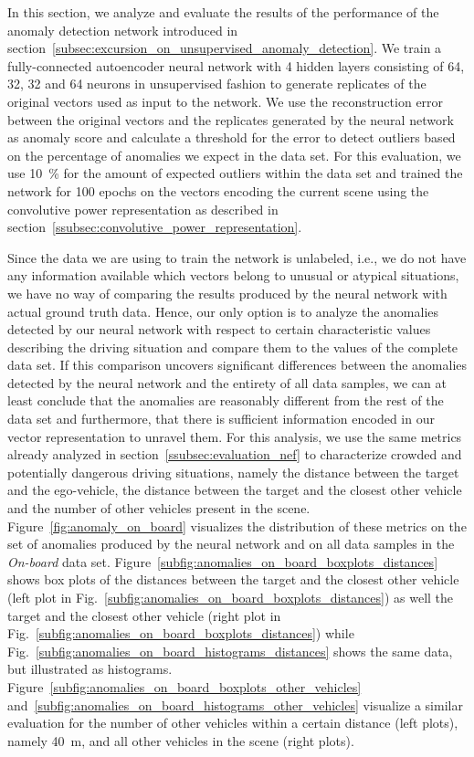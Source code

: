 In this section, we analyze and evaluate the results of the performance of the anomaly detection network introduced in section~\ref{subsec:excursion_on_unsupervised_anomaly_detection}.
We train a fully-connected autoencoder neural network with \num{4} hidden layers consisting of \num{64}, \num{32}, \num{32} and \num{64} neurons in unsupervised fashion to generate replicates of the original vectors used as input to the network.
We use the reconstruction error between the original vectors and the replicates generated by the neural network as anomaly score and calculate a threshold for the error to detect outliers based on the percentage of anomalies we expect in the data set.
For this evaluation, we use \SI{10}{\percent} for the amount of expected outliers within the data set and trained the network for \num{100} epochs on the vectors encoding the current scene using the convolutive power representation as described in section~\ref{ssubsec:convolutive_power_representation}.

Since the data we are using to train the network is unlabeled, i.e., we do not have any information available which vectors belong to unusual or atypical situations, we have no way of comparing the results produced by the neural network with actual ground truth data.
Hence, our only option is to analyze the anomalies detected by our neural network with respect to certain characteristic values describing the driving situation and compare them to the values of the complete data set.
If this comparison uncovers significant differences between the anomalies detected by the neural network and the entirety of all data samples, we can at least conclude that the anomalies are reasonably different from the rest of the data set and furthermore, that there is sufficient information encoded in our vector representation to unravel them.
For this analysis, we use the same metrics already analyzed in section~\ref{ssubsec:evaluation_nef} to characterize crowded and potentially dangerous driving situations, namely the distance between the target and the ego-vehicle, the distance between the target and the closest other vehicle and the number of other vehicles present in the scene.
Figure~\ref{fig:anomaly_on_board} visualizes the distribution of these metrics on the set of anomalies produced by the neural network and on all data samples in the \emph{On-board} data set.
Figure~\ref{subfig:anomalies_on_board_boxplots_distances} shows box plots of the distances between the target and the closest other vehicle (left plot in Fig.~\ref{subfig:anomalies_on_board_boxplots_distances}) as well the target and the closest other vehicle (right plot in Fig.~\ref{subfig:anomalies_on_board_boxplots_distances}) while Fig.~\ref{subfig:anomalies_on_board_histograms_distances} shows the same data, but illustrated as histograms.
Figure~\ref{subfig:anomalies_on_board_boxplots_other_vehicles} and~\ref{subfig:anomalies_on_board_histograms_other_vehicles} visualize a similar evaluation for the number of other vehicles within a certain distance (left plots), namely \SI{40}{\meter}, and all other vehicles in the scene (right plots).

